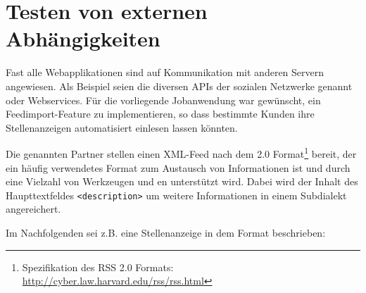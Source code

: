 \section{Testen von externen Abhängigkeiten}
\label{sec:awmock}
Fast alle Webapplikationen sind auf Kommunikation mit anderen Servern angewiesen. Als Beispiel seien die diversen APIs der sozialen Netzwerke genannt oder Webservices. Für die vorliegende Jobanwendung war gewünscht, ein Feedimport-Feature zu implementieren, so dass bestimmte Kunden ihre Stellenanzeigen automatisiert einlesen lassen könnten.

Die genannten Partner stellen einen XML-Feed nach dem  2.0 Format\footnote{Spezifikation des RSS 2.0 Formats: \url{http://cyber.law.harvard.edu/rss/rss.html}} bereit, der ein häufig verwendetes Format zum Austausch von Informationen ist und durch eine Vielzahl von Werkzeugen und en unterstützt wird.
Dabei wird der Inhalt des Haupttextfeldes \verb|<description>| um weitere Informationen in einem Subdialekt angereichert.

Im Nachfolgenden sei z.B. eine Stellenanzeige in dem Format beschrieben:

